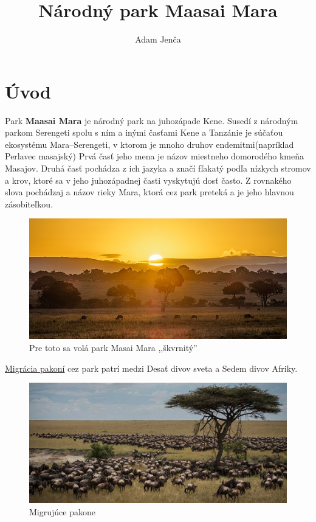 \documentclass{article}
\title{Národný park Maasai Mara}
\author{Adam Jenča}
\begin{document}
\maketitle
{{\tableofcontents{}}}
\newpage
\section{Úvod}
Park \textbf{Maasai Mara} je národný park na juhozápade Kene. Susedí z národným parkom Serengeti spolu s ním a inými časťami Kene a Tanzánie je súčaťou ekosystému Mara--Serengeti, v ktorom je mnoho druhov endemitmi(napríklad Perlavec masajský) Prvá časť jeho mena je názov miestneho domorodého kmeňa Masajov. Druhá časť pochádza z ich jazyka a značí fľakatý podľa nízkych stromov a krov, ktoré sa v jeho juhozápadnej časti vyskytujú dosť často. Z rovnakého slova pochádzaj a názov rieky Mara, ktorá cez park preteká a je jeho hlavnou zásobiteľkou.

\begin{figure}[h]
\centering
\includegraphics[scale=0.65]{mara-skvrnity.jpg} \caption{Pre toto sa volá park Masai Mara ,,škvrnitý''}
\end{figure}

\noindent
 \hyperref[sec:gmwildebe]{Migrácia pakoní} cez park patrí medzi Desať divov sveta a Sedem divov Afriky.
\vskip 5mm
%

\begin{figure}[h]
\centering
\includegraphics[scale=0.35]{migracia-velka.jpg} \caption{Migrujúce pakone}
\end{figure}
\end{document}
